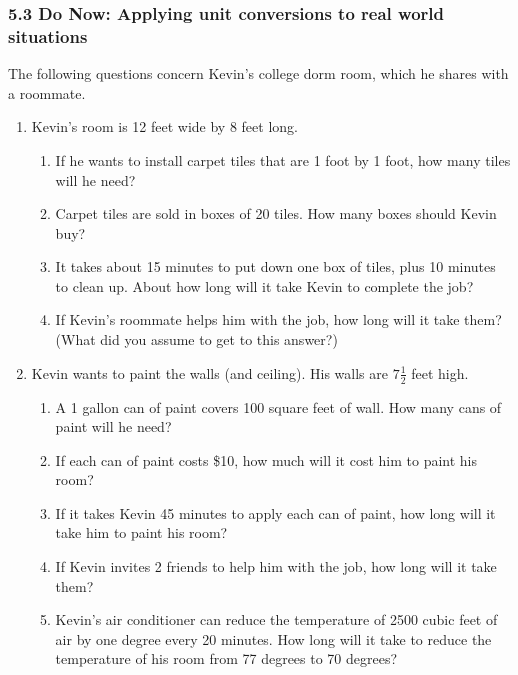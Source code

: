 \documentclass[12pt, twoside]{article}
\begin{document}
\subsubsection*{5.3 Do Now: Applying unit conversions to real world situations}

The following questions concern Kevin’s college dorm room, which he shares with a roommate.

\begin{enumerate}


\item Kevin’s room is 12 feet wide by 8 feet long.
\begin{enumerate}
  \item If he wants to install carpet tiles that are 1 foot by 1 foot, how many tiles will he need? \vspace{3cm}
  \item Carpet tiles are sold in boxes of 20 tiles. How many boxes should Kevin buy? \vspace{4cm}
  \item It takes about 15 minutes to put down one box of tiles, plus 10 minutes to clean up. About how long will it take Kevin to complete the job?  \vspace{5cm}
  \item If Kevin's roommate helps him with the job, how long will it take them? \\ 
  (What did you assume to get to this answer?) \vspace{3cm}
\end{enumerate}

\newpage
\item Kevin wants to paint the walls (and ceiling). His walls are $7 \frac{1}{2}$ feet high.
\begin{enumerate}
  \item A 1 gallon can of paint covers 100 square feet of wall. How many cans of paint will he need?  \vspace{5cm}
  \item If each can of paint costs \$10, how much will it cost him to paint his room? \vspace{2cm}
  \item If it takes Kevin 45 minutes to apply each can of paint, how long will it take him to paint his room? \vspace{2cm}
  \item If Kevin invites 2 friends to help him with the job, how long will it take them?  \vspace{2cm}
  \item Kevin’s air conditioner can reduce the temperature of 2500 cubic feet of air by one degree every 20 minutes. How long will it take to reduce the temperature of his room from 77 degrees to 70 degrees?
\end{enumerate}


\end{enumerate}
\end{document}

